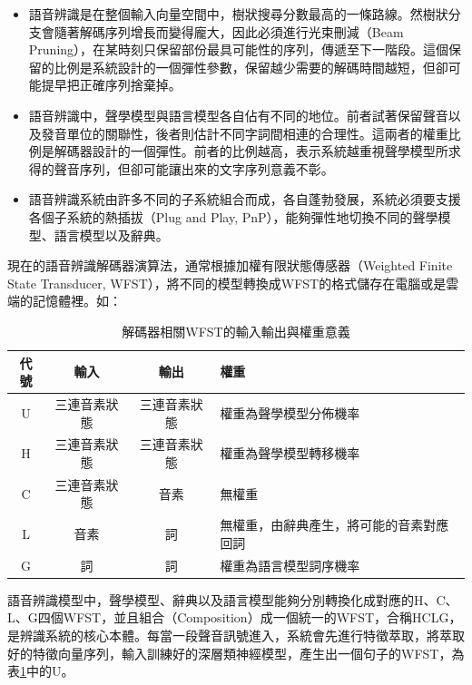 \begin{itemize}
\itemsep -2pt %
  \item 語音辨識是在整個輸入向量空間中，樹狀搜尋分數最高的一條路線。然樹狀分支會隨著解碼序列增長而變得龐大，因此必須進行光束刪減（Beam Pruning），在某時刻只保留部份最具可能性的序列，傳遞至下一階段。這個保留的比例是系統設計的一個彈性參數，保留越少需要的解碼時間越短，但卻可能提早把正確序列捨棄掉。

 \item 語音辨識中，聲學模型與語言模型各自佔有不同的地位。前者試著保留聲音以及發音單位的關聯性，後者則估計不同字詞間相連的合理性。這兩者的權重比例是解碼器設計的一個彈性。前者的比例越高，表示系統越重視聲學模型所求得的聲音序列，但卻可能讓出來的文字序列意義不彰。

 \item 語音辨識系統由許多不同的子系統組合而成，各自蓬勃發展，系統必須要支援各個子系統的熱插拔（Plug and Play, PnP），能夠彈性地切換不同的聲學模型、語言模型以及辭典。
\end{itemize}

現在的語音辨識解碼器演算法，通常根據加權有限狀態傳感器（Weighted Finite State Transducer, WFST），將不同的模型轉換成WFST的格式儲存在電腦或是雲端的記憶體裡。如：



\begin{table}[htbp]
\centering
\begin{tabular}{|cccl|}
\hline
 代號 & 輸入 & 輸出 & 權重 \\
\hline
 U    & 三連音素狀態 & 三連音素狀態 & 權重為聲學模型分佈機率 \\
\hline
 H    & 三連音素狀態 & 三連音素狀態 & 權重為聲學模型轉移機率 \\
\hline 
 C    & 三連音素狀態 & 音素 & 無權重  \\
\hline
 L    & 音素 & 詞 & 無權重，由辭典產生，將可能的音素對應回詞 \\
\hline
 G    & 詞 & 詞 & 權重為語言模型詞序機率   \\
\hline

\end{tabular}
\caption{解碼器相關WFST的輸入輸出與權重意義}
\label{table:chap3_wfst}
\end{table}

語音辨識模型中，聲學模型、辭典以及語言模型能夠分別轉換化成對應的H、C、L、G四個WFST，並且組合（Composition）成一個統一的WFST，合稱HCLG，是辨識系統的核心本體。每當一段聲音訊號進入，系統會先進行特徵萃取，將萃取好的特徵向量序列，輸入訓練好的深層類神經模型，產生出一個句子的WFST，為表\ref{table:chap3_wfst}中的U。

